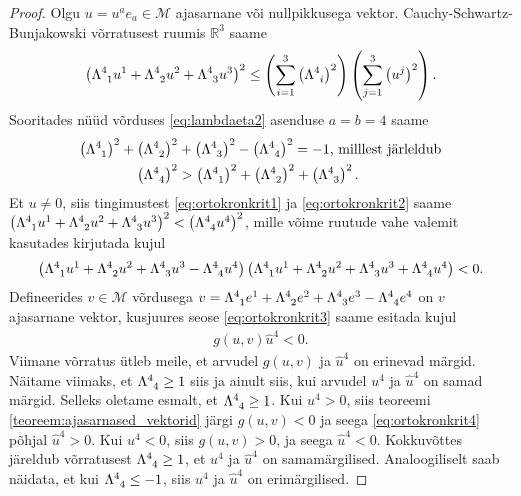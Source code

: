 \documentclass[12pt]{article}
\theoremstyle{plain}
\theoremstyle{definition}
\numberwithin{equation}{section}
\def\R{{\mathbb R}}
\def\M{{\mathcal M}}
\begin{document}
\begin{proof}
Olgu $u = u^a e_a \in \M$ ajasarnane või nullpikkusega vektor. 
Cauchy-Schwartz-Bunjakowski võrratusest ruumis $\R^{3}$ saame
\begin{align} \label{eq:ortokronkrit1}
\left(\Lambda\indices{^4_1} u^1 + \Lambda\indices{^4_2} u^2 + 
\Lambda\indices{^4_3} u^3\right)^2 \leq \left(\sum_{i = 1}^{3} 
\left(\Lambda\indices{^4_i}\right)^2 \right) \left(\sum_{j = 1}^{3} 
\left(u^j\right)^2 \right).
\end{align}
Sooritades nüüd võrduses \ref{eq:lambdaeta2} asenduse $a = b = 4$ 
saame
\begin{align} \label{eq:ortokronkrit2}
\left(\Lambda\indices{^4_1}\right)^2 + 
	\left(\Lambda\indices{^4_2}\right)^2 &+ 
	\left(\Lambda\indices{^4_3}\right)^2 - 
	\left(\Lambda\indices{^4_4}\right)^2 = 
	-1 \text{, milllest järleldub} \nonumber \\
\left(\Lambda\indices{^4_4}\right)^2 &> 
	\left(\Lambda\indices{^4_1}\right)^2 + 
	\left(\Lambda\indices{^4_2}\right)^2 + 
	\left(\Lambda\indices{^4_3}\right)^2.
\end{align}
Et $u \neq 0$, siis tingimustest \ref{eq:ortokronkrit1} ja 
\ref{eq:ortokronkrit2} saame $\left(\Lambda\indices{^4_1} u^1 
+ \Lambda\indices{^4_2} u^2 + \Lambda\indices{^4_3} u^3\right)^2 < 
\left(\Lambda\indices{^4_4} u^4\right)^2$, 
mille võime ruutude vahe valemit kasutades kirjutada kujul
\begin{align} \label{eq:ortokronkrit3}
\left(\Lambda\indices{^4_1} u^1 + \Lambda\indices{^4_2} u^2 + 
\Lambda\indices{^4_3} u^3 - \Lambda\indices{^4_4} u^4\right)
\left(\Lambda\indices{^4_1} u^1 + \Lambda\indices{^4_2} u^2 + 
\Lambda\indices{^4_3} u^3 + \Lambda\indices{^4_4} u^4\right) < 0.
\end{align}
Defineerides $v \in \M$ võrdusega $v = \Lambda\indices{^4_1} e^1 + 
\Lambda\indices{^4_2} e^2 + \Lambda\indices{^4_3} e^3 - 
\Lambda\indices{^4_4} e^4$ on $v$ ajasarnane vektor, kusjuures seose 
\ref{eq:ortokronkrit3} saame esitada kujul
\begin{align} \label{eq:ortokronkrit4}
g\left(u , v\right)\hat{u}^4 < 0.
\end{align}
Viimane võrratus ütleb meile, et arvudel $g\left(u,v\right)$ ja 
$\hat{u}^4$ on erinevad märgid.
Näitame viimaks, et $\Lambda\indices{^4_4} \geq 1$ siis ja ainult 
siis, kui arvudel $u^4$ ja $\hat{u}^4$ on samad märgid.
Selleks oletame esmalt, et $\Lambda\indices{^4_4} \geq 1$. Kui 
$u^4 > 0$, siis teoreemi \ref{teoreem:ajasarnased_vektorid} järgi 
$g\left(u, v\right) < 0$ ja seega \ref{eq:ortokronkrit4} põhjal 
$\hat{u}^4 >0$. Kui $u^4 < 0$, siis $g\left(u, v\right) > 0$, ja 
seega $\hat{u}^4 < 0$. Kokkuvõttes järeldub võrratusest 
$\Lambda\indices{^4_4} \geq 1$, et $u^4$ ja $\hat{u}^4$ on 
samamärgilised. Analoogiliselt saab näidata, et kui 
$\Lambda\indices{^4_4} \leq -1$, siis $u^4$ ja $\hat{u}^4$ on 
erimärgilised.
\end{proof}
\end{document}
